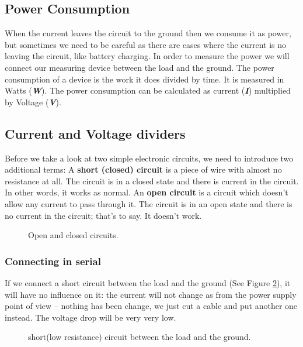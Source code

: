 \subsection{Power Consumption}

When the current leaves the circuit to the ground then we consume it as power, but sometimes we need to be careful as there are cases where the current is no leaving the circuit, like battery charging. In order to measure the power we will connect our measuring device between the load and the ground. The power consumption of a device is the work it does divided by time. It is measured in Watts (\textbf{\textit{W}}). The power consumption can be calculated as current (\textbf{\textit{I}}) multiplied by Voltage (\textbf{\textit{V}}).

\subsection{Current and Voltage dividers}

Before we take a look at two simple electronic circuits, we need to introduce two additional terms:
A \textbf{short (closed) circuit} is a piece of wire with almost no resistance at all. The circuit is in a closed state and there is current in the circuit. In other words, it works as normal.
An \textbf{open circuit} is a circuit which doesn't allow any current to pass through it. The circuit is in an open state and there is no current in the circuit; that's to say. It doesn't work.

\begin{figure}[!ht]
    \centering
    
    \caption{Open and closed circuits.} \label{fig:open_closed_circuits}
\end{figure}

\subsubsection{Connecting in serial}

If we connect a short circuit between the load and the ground (See Figure \ref{fig:circuit1}), it will have no influence on it: the current will not change as from the power supply point of view – nothing has been change, we just cut a cable and put another one instead. The voltage drop will be very very low.

\begin{figure}[!ht]
    \centering
    
    \caption{short(low resistance) circuit between the load and the ground.} \label{fig:circuit1}
\end{figure}

